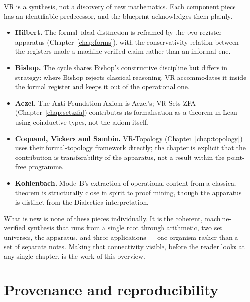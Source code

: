 VR is a synthesis, not a discovery of new mathematics.  Each component
piece has an identifiable predecessor, and the blueprint acknowledges them
plainly.

\begin{itemize}
\item \textbf{Hilbert.}  The formal--ideal distinction is reframed by the
two-register apparatus (Chapter~\ref{chap:forms}), with the conservativity
relation between the registers made a machine-verified claim rather than an
informal one.

\item \textbf{Bishop.}  The cycle shares Bishop's constructive discipline
but differs in strategy: where Bishop rejects classical reasoning, VR
accommodates it inside the formal register and keeps it out of the
operational one.

\item \textbf{Aczel.}  The Anti-Foundation Axiom is Aczel's; VR-Sets-ZFA
(Chapter~\ref{chap:setszfa}) contributes its formalisation as a theorem in
Lean using coinductive types, not the axiom itself.

\item \textbf{Coquand, Vickers and Sambin.}  VR-Topology
(Chapter~\ref{chap:topology}) uses their formal-topology framework directly;
the chapter is explicit that the contribution is transferability of the
apparatus, not a result within the point-free programme.

\item \textbf{Kohlenbach.}  Mode~B's extraction of operational content from
a classical theorem is structurally close in spirit to proof mining, though
the apparatus is distinct from the Dialectica interpretation.
\end{itemize}

What is new is none of these pieces individually.  It is the coherent,
machine-verified synthesis that runs from a single root through arithmetic,
two set universes, the apparatus, and three applications --- one organism
rather than a set of separate notes.  Making that connectivity visible, before
the reader looks at any single chapter, is the work of this overview.

\section{Provenance and reproducibility}
\label{sec:overview_provenance}


